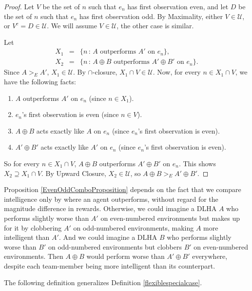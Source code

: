 \documentclass[twoside,11pt]{article}
\begin{document}
\begin{proof}
Let $V$ be the set of $n$ such that $e_n$ has first observation even, and let
$D$ be the set of $n$ such that $e_n$ has first observation odd.
By Maximality, either $V\in\mathscr U$, or $V^c=D\in\mathscr U$. We will assume
$V\in\mathscr U$, the other case is similar.

Let
\begin{eqnarray*}
    X_1 &=& \{n\,:\,\mbox{$A$ outperforms $A'$ on $e_n$}\},\\
    X_2 &=& \{n\,:\,\mbox{$A\oplus B$ outperforms $A'\oplus B'$ on $e_n$}\}.
\end{eqnarray*}
Since $A>_{E}A'$, $X_1\in\mathscr U$. By $\cap$-closure, $X_1\cap V\in\mathscr U$.
Now, for every $n\in X_1\cap V$, we have the following facts:
\begin{enumerate}
    \item
    $A$ outperforms $A'$ on $e_n$ (since $n\in X_1$).
    \item
    $e_n$'s first observation is even (since $n\in V$).
    \item
    $A\oplus B$ acts exactly like $A$ on $e_n$ (since $e_n$'s first observation is even).
    \item
    $A'\oplus B'$ acts exactly like $A'$ on $e_n$ (since $e_n$'s first observation is even).
\end{enumerate}
So for every $n\in X_1\cap V$, $A\oplus B$ outperforms $A'\oplus B'$ on $e_n$.
This shows $X_2\supseteq X_1\cap V$.
By Upward Closure, $X_2\in\mathscr U$, so $A\oplus B >_{E} A'\oplus B'$.
\end{proof}

Proposition \ref{EvenOddComboProposition} depends on the fact that we
compare intelligence only by where an agent outperforms,
without regard for the magnitude difference in rewards.
Otherwise, we could imagine a DLHA $A$ who performs slightly worse than $A'$
on even-numbered environments but makes up for it by clobbering $A'$ on
odd-numbered environments, making $A$ more intelligent than $A'$.
And we could imagine a DLHA $B$ who performs slightly worse than $B'$ on
odd-numbered environments but clobbers $B'$ on even-numbered environments.
Then $A\oplus B$ would perform worse than $A'\oplus B'$ everywhere, despite
each team-member being more intelligent than its counterpart.

The following definition generalizes Definition \ref{flexiblespecialcase}.
\end{document}
